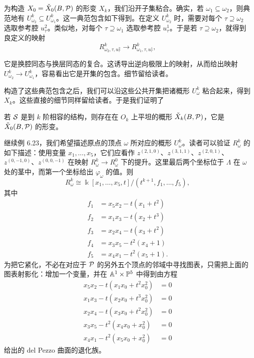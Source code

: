 为构造 $X_0=\check X_0(B,\mathcal{P})$ 的形变 $X_k$，我们沿开子集粘合。确实，若 $\omega_1\subseteq\omega_2$，则典范地有 $U^k_{\omega_2}\subseteq U^k_{\omega_1}$。这一典范包含如下得到。在定义 $U^k_{\omega_2}$ 时，需要对每个 $\tau\supseteq\omega_2$ 选取参考腔 $u^2_\tau$。类似地，对每个 $\tau\supseteq\omega_1$ 选取参考腔 $u^1_\tau$。于是若 $\tau\supseteq\omega_2$，就得到良定义的映射
\[
  R^k_{\omega_2,\tau,u^2_\tau}\to R^k_{\omega_1,\tau,u^1_\tau},
\]

它是换腔同态与换层同态的复合。这诱导出逆向极限上的映射，从而给出映射 $U^k_{\omega_2}\to U^k_{\omega_1}$，容易看出它是开集的包含。细节留给读者。

构造了这些典范包含之后，我们可以沿这些公共开集把诸概形 $U^k_\omega$ 粘合起来，得到 $X_k$。这些直接的细节同样留给读者。于是我们证明了

\begin{theorem}
若 $\mathcal{S}$ 是到 $k$ 阶相容的结构，则存在在 $O_k$ 上平坦的概形 $\check X_k(B,\mathcal{P})$，它是 $\check X_0(B,\mathcal{P})$ 的形变。
\end{theorem}

\begin{example}
继续例 6.23，我们希望描述原点的顶点 $\omega$ 所对应的概形 $U^k_\omega$。读者可以验证 $R^k_\omega$ 的如下描述：使用变量 $x_1,\ldots,x_5$，它们应看作 $z^{(2,1,0)}$、$z^{(3,1,1)}$、$z^{(2,0,1)}$、$z^{(0,-1,0)}$、$z^{(0,0,-1)}$ 在映射 $R^k_\omega\to R^0_\omega$ 下的提升。这里最后两个坐标位于 $\Lambda$ 在 $\omega$ 处的茎中，而第一个坐标给出 $\varphi_\omega$ 的值。则
\[
  R^k_\omega\cong\Bbbk[x_1,\ldots,x_5,t]/(t^{k+1},f_1,\ldots,f_5),
\]
其中
\[
  \begin{aligned}
    f_1&=x_5x_2-t(x_1+t^2)\\
    f_2&=x_1x_3-t(x_2+t^3)\\
    f_3&=x_2x_4-t(x_3+t^2)\\
    f_4&=x_3x_5-t^2(x_4+1)\\
    f_5&=x_4x_1-t^2(x_5+1).
  \end{aligned}
\]
为把它紧化，不必在对应于 $\mathcal{P}$ 的另外五个顶点的邻域中寻找图表，只需把上面的图表射影化：增加一个变量，并在 $\mathbb{A}^1\times\mathbb{P}^5$ 中得到由方程
\[
  \begin{aligned}
    x_5x_2-t(x_1x_0+t^2x_0^2)&=0\\
    x_1x_3-t(x_2x_0+t^3x_0^2)&=0\\
    x_2x_4-t(x_3x_0+t^2x_0^2)&=0\\
    x_3x_5-t^2(x_4x_0+x_0^2)&=0\\
    x_4x_1-t^2(x_5x_0+x_0^2)&=0
  \end{aligned}
\]
给出的 del Pezzo 曲面的退化族。
\end{example}

